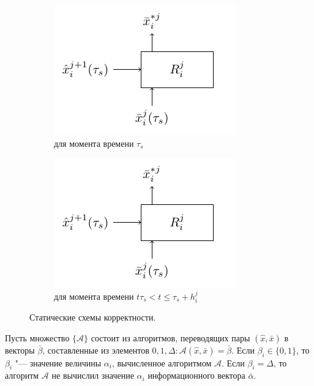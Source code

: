 \documentclass[a4paper, 12pt]{article}
\theoremstyle{plain}
\begin{document}
	\begin{figure}[h]
		\centering
		\begin{subfigure}[b]{0.4\textwidth}
			\includegraphics[width=\linewidth,page=1]{rb_correct}
			\caption{для момента времени $\tau_s$}
			\label{fig:rb_correct_stat0}
		\end{subfigure}
		\qquad
		\begin{subfigure}[b]{0.4\textwidth}
			\includegraphics[width=0.9\linewidth,page=2]{rb_correct}
			\caption{для момента времени $t\tau_s<t\leqslant\tau_s+h_i^j$}
			\label{fig:rb_correct_statt}
		\end{subfigure}		
		\caption{Статические схемы корректности.}
	\end{figure}
	
	Пусть множество $\{\mathcal{A}\}$ состоит из алгоритмов, переводящих пары $(\hat{x},\bar{x})$ в векторы $\bar{\beta}$, составленные из элементов $0,1,\Delta:\mathcal{A}(\hat{x},\bar{x})=\bar{\beta}$. Если $\beta_i\in\{0,1\}$, то $\beta_i$ "--- значение величины $\alpha_i$, вычисленное алгоритмом $\mathcal{A}$. Если $\beta_i=\Delta$, то алгоритм $\mathcal{A}$ не вычислил значение $\alpha_i$ информационного вектора $\bar\alpha$.
	
\end{document}
